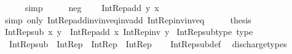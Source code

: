 \begin{isabellebody}
\ \ \ \ \isamarkupfalse%
\ simp\isanewline
\ \ \isamarkupfalse%
\ \isamarkupfalse%
\ neg\ \isamarkupfalse%
\ {\isachardoublequoteopen}{\isachardot}{\kern0pt}{\isachardot}{\kern0pt}{\isachardot}{\kern0pt}\ {\isacharequal}{\kern0pt}\ Int{\isacharunderscore}{\kern0pt}Rep{\isacharunderscore}{\kern0pt}add\ y\ x{\isachardoublequoteclose}\isanewline
\ \ \ \ \isamarkupfalse%
\ {\isacharparenleft}{\kern0pt}simp\ only{\isacharcolon}{\kern0pt}\ Int{\isacharunderscore}{\kern0pt}Rep{\isacharunderscore}{\kern0pt}add{\isacharunderscore}{\kern0pt}inv{\isacharunderscore}{\kern0pt}inv{\isacharunderscore}{\kern0pt}eq{\isacharunderscore}{\kern0pt}inv{\isacharunderscore}{\kern0pt}add\ Int{\isacharunderscore}{\kern0pt}Rep{\isacharunderscore}{\kern0pt}inv{\isacharunderscore}{\kern0pt}inv{\isacharunderscore}{\kern0pt}eq{\isacharparenright}{\kern0pt}\isanewline
\ \ \isamarkupfalse%
\ \isamarkupfalse%
\ {\isacharquery}{\kern0pt}thesis\ \isacommand{{\isachardot}{\kern0pt}}\isamarkupfalse%
\isanewline
{}\isamarkupfalse%
%
\endisatagproof
{\isafoldproof}%
%
\isadelimproof
\isanewline
%
\endisadelimproof
\isanewline
{}\isamarkupfalse%
\ {\isachardoublequoteopen}Int{\isacharunderscore}{\kern0pt}Rep{\isacharunderscore}{\kern0pt}sub\ x\ y\ {\isasymequiv}\ Int{\isacharunderscore}{\kern0pt}Rep{\isacharunderscore}{\kern0pt}add\ x\ {\isacharparenleft}{\kern0pt}Int{\isacharunderscore}{\kern0pt}Rep{\isacharunderscore}{\kern0pt}inv\ y{\isacharparenright}{\kern0pt}{\isachardoublequoteclose}\isanewline
\isanewline
{}\isamarkupfalse%
\ Int{\isacharunderscore}{\kern0pt}Rep{\isacharunderscore}{\kern0pt}sub{\isacharunderscore}{\kern0pt}type\ {\isacharbrackleft}{\kern0pt}type{\isacharbrackright}{\kern0pt}{\isacharcolon}{\kern0pt}\isanewline
\ \ {\isachardoublequoteopen}Int{\isacharunderscore}{\kern0pt}Rep{\isacharunderscore}{\kern0pt}sub\ {\isacharcolon}{\kern0pt}\ Int{\isacharunderscore}{\kern0pt}Rep\ {\isasymRightarrow}\ Int{\isacharunderscore}{\kern0pt}Rep\ {\isasymRightarrow}\ Int{\isacharunderscore}{\kern0pt}Rep{\isachardoublequoteclose}\isanewline
%
\isadelimproof
\ \ %
\endisadelimproof
%
\isatagproof
{}\isamarkupfalse%
\ Int{\isacharunderscore}{\kern0pt}Rep{\isacharunderscore}{\kern0pt}sub{\isacharunderscore}{\kern0pt}def\ \isamarkupfalse%
\ discharge{\isacharunderscore}{\kern0pt}types%
\endisatagproof
{\isafoldproof}%
%
\isadelimproof
\isanewline
%
\endisadelimproof
\isanewline
%
\isadelimtheory
\isanewline
%
\endisadelimtheory
%
\isatagtheory
{}\isamarkupfalse%
%
\endisatagtheory
{\isafoldtheory}%
%
\isadelimtheory
%
\endisadelimtheory
%
\end{isabellebody}%
